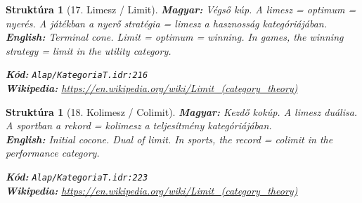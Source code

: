 \documentclass[11pt,a4paper,twocolumn]{article}
\newtheorem{struktura}[tetel]{Struktúra}
\begin{document}
\begin{struktura}[17. Limesz / Limit]

\textbf{Magyar:} Végső kúp. A limesz = optimum = nyerés. A játékban a nyerő stratégia = limesz a hasznosság kategóriájában.\\

\textbf{English:} Terminal cone. Limit = optimum = winning. In games, the winning strategy = limit in the utility category.\\

\begin{center}
\end{center}

\textbf{Kód:} \texttt{Alap/KategoriaT.idr:216}\\
\textbf{Wikipedia:} \url{https://en.wikipedia.org/wiki/Limit_(category_theory)}

\end{struktura}

\vspace{0.5cm}

\begin{struktura}[18. Kolimesz / Colimit]

\textbf{Magyar:} Kezdő kokúp. A limesz duálisa. A sportban a rekord = kolimesz a teljesítmény kategóriájában.\\

\textbf{English:} Initial cocone. Dual of limit. In sports, the record = colimit in the performance category.\\

\begin{center}
\end{center}

\textbf{Kód:} \texttt{Alap/KategoriaT.idr:223}\\
\textbf{Wikipedia:} \url{https://en.wikipedia.org/wiki/Limit_(category_theory)}

\end{struktura}

\vspace{0.5cm}
\end{document}
